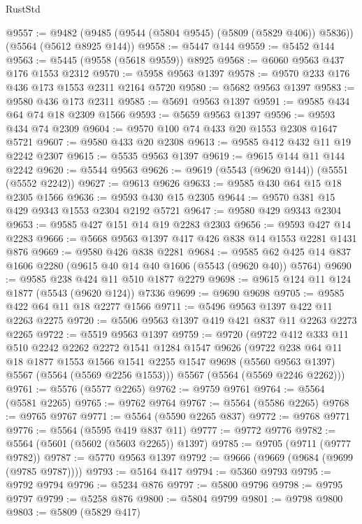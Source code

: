\begin{lexlean}{RustStd}
\begin{coremodule}
@9557 := @9482 (@9485 (@9544 (@5804 @9545) (@5809 (@5829 @406)) @5836)) (@5564 (@5612 @8925 @144))
@9558 := @5447 @144
@9559 := @5452 @144
@9563 := @5445 (@9558 (@5618 @9559)) @8925
@9568 := @6060 @9563 @437 @176 @1553 @2312
@9570 := @5958 @9563 @1397
@9578 := @9570 @233 @176 @436 @173 @1553 @2311 @2164 @5720
@9580 := @5682 @9563 @1397
@9583 := @9580 @436 @173 @2311
@9585 := @5691 @9563 @1397
@9591 := @9585 @434 @64 @74 @18 @2309 @1566
@9593 := @5659 @9563 @1397
@9596 := @9593 @434 @74 @2309
@9604 := @9570 @100 @74 @433 @20 @1553 @2308 @1647 @5721
@9607 := @9580 @433 @20 @2308
@9613 := @9585 @412 @432 @11 @19 @2242 @2307
@9615 := @5535 @9563 @1397
@9619 := @9615 @144 @11 @144 @2242
@9620 := @5544 @9563
@9626 := @9619 (@5543 (@9620 @144)) (@5551 (@5552 @2242))
@9627 := @9613 @9626
@9633 := @9585 @430 @64 @15 @18 @2305 @1566
@9636 := @9593 @430 @15 @2305
@9644 := @9570 @381 @15 @429 @9343 @1553 @2304 @2192 @5721
@9647 := @9580 @429 @9343 @2304
@9653 := @9585 @427 @151 @14 @19 @2283 @2303
@9656 := @9593 @427 @14 @2283
@9666 := @5668 @9563 @1397 @417 @426 @838 @14 @1553 @2281 @1431 @876
@9669 := @9580 @426 @838 @2281
@9684 := @9585 @62 @425 @14 @837 @1606 @2280 (@9615 @40 @14 @40 @1606 (@5543 (@9620 @40)) @5764)
@9690 := @9585 @238 @424 @11 @510 @1877 @2279
@9698 := @9615 @124 @11 @124 @1877 (@5543 (@9620 @124)) @7336
@9699 := @9690 @9698
@9705 := @9585 @422 @64 @11 @18 @2277 @1566
@9711 := @5496 @9563 @1397 @422 @11 @2263 @2275
@9720 := @5506 @9563 @1397 @419 @421 @837 @11 @2263 @2273 @2265
@9722 := @5519 @9563 @1397
@9759 := @9720
    (@9722
      @412
      @333
      @11
      @510
      @2242
      @2262
      @2272
      @1541
      @1284
      @1547
      @9626
      (@9722
        @238
        @64
        @11
        @18
        @1877
        @1553
        @1566
        @1541
        @2255
        @1547
        @9698
        (@5560 @9563 @1397)
        @5567
        (@5564 (@5569 @2256 @1553)))
      @5567
      (@5564 (@5569 @2246 @2262)))
@9761 := @5576 (@5577 @2265)
@9762 := @9759 @9761
@9764 := @5564 (@5581 @2265)
@9765 := @9762 @9764
@9767 := @5564 (@5586 @2265)
@9768 := @9765 @9767
@9771 := @5564 (@5590 @2265 @837)
@9772 := @9768 @9771
@9776 := @5564 (@5595 @419 @837 @11)
@9777 := @9772 @9776
@9782 := @5564 (@5601 (@5602 (@5603 @2265)) @1397)
@9785 := @9705 (@9711 (@9777 @9782))
@9787 := @5770 @9563 @1397
@9792 := @9666 (@9669 (@9684 (@9699 (@9785 @9787))))
@9793 := @5164 @417
@9794 := @5360 @9793
@9795 := @9792 @9794
@9796 := @5234 @876
@9797 := @5800 @9796
@9798 := @9795 @9797
@9799 := @5258 @876
@9800 := @5804 @9799
@9801 := @9798 @9800
@9803 := @5809 (@5829 @417)

\end{coremodule}
\end{lexlean}
